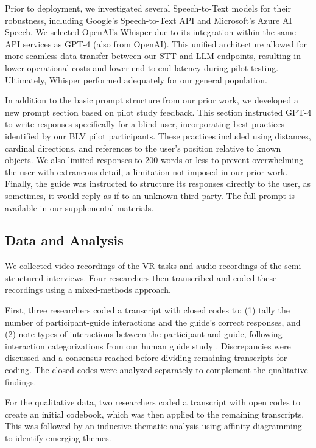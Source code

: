 Prior to deployment, we investigated several Speech-to-Text models for their robustness, including Google's Speech-to-Text API and Microsoft’s Azure AI Speech. We selected OpenAI’s Whisper due to its integration within the same API services as GPT-4 (also from OpenAI). This unified architecture allowed for more seamless data transfer between our STT and LLM endpoints, resulting in lower operational costs and lower end-to-end latency during pilot testing. Ultimately, Whisper performed adequately for our general population.

In addition to the basic prompt structure from our prior work, we developed a new prompt section based on pilot study feedback. This section instructed GPT-4 to write responses specifically for a blind user, incorporating best practices identified by our BLV pilot participants. These practices included using distances, cardinal directions, and references to the user's position relative to known objects. We also limited responses to 200 words or less to prevent overwhelming the user with extraneous detail, a limitation not imposed in our prior work. Finally, the guide was instructed to structure its responses directly to the user, as sometimes, it would reply as if to an unknown third party. The full prompt is available in our supplemental materials.

\subsection{Data and Analysis}
We collected video recordings of the VR tasks and audio recordings of the semi-structured interviews. Four researchers then transcribed and coded these recordings using a mixed-methods approach.

First, three researchers coded a transcript with closed codes to: (1) tally the number of participant-guide interactions and the guide’s correct responses, and (2) note types of interactions between the participant and guide, following interaction categorizations from our human guide study \cite{collins2023guide}. Discrepancies were discussed and a consensus reached before dividing remaining transcripts for coding. The closed codes were analyzed separately to complement the qualitative findings.

For the qualitative data, two researchers coded a transcript with open codes to create an initial codebook, which was then applied to the remaining transcripts. This was followed by an inductive thematic analysis \cite{clarke2017thematic, braun2019reflecting} using affinity diagramming to identify emerging themes.

